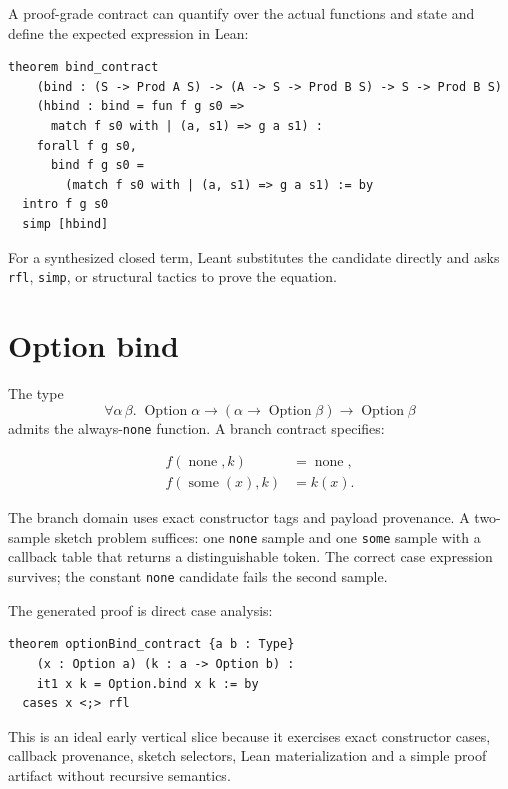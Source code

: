 \documentclass[11pt,oneside]{report}
\newcommand{\code}[1]{\texttt{#1}}
\begin{document}
A proof-grade contract can quantify over the actual functions and state and define the expected expression in Lean:

\begin{lstlisting}[language=LeanX,caption={Lean theorem shape for state bind.}]
theorem bind_contract
    (bind : (S -> Prod A S) -> (A -> S -> Prod B S) -> S -> Prod B S)
    (hbind : bind = fun f g s0 =>
      match f s0 with | (a, s1) => g a s1) :
    forall f g s0,
      bind f g s0 =
        (match f s0 with | (a, s1) => g a s1) := by
  intro f g s0
  simp [hbind]
\end{lstlisting}

For a synthesized closed term, Leant substitutes the candidate directly and asks \code{rfl}, \code{simp}, or structural tactics to prove the equation.

\section{Option bind}
\label{sec:example-option}

The type
\[
\forall \alpha\,\beta.\;\operatorname{Option}\alpha\to
(\alpha\to\operatorname{Option}\beta)\to\operatorname{Option}\beta
\]
admits the always-\code{none} function. A branch contract specifies:

\begin{align*}
 f(\operatorname{none},k) &= \operatorname{none},\\
 f(\operatorname{some}(x),k) &= k(x).
\end{align*}

The branch domain uses exact constructor tags and payload provenance. A two-sample sketch problem suffices: one \code{none} sample and one \code{some} sample with a callback table that returns a distinguishable token. The correct case expression survives; the constant \code{none} candidate fails the second sample.

The generated proof is direct case analysis:

\begin{lstlisting}[language=LeanX]
theorem optionBind_contract {a b : Type}
    (x : Option a) (k : a -> Option b) :
    it1 x k = Option.bind x k := by
  cases x <;> rfl
\end{lstlisting}

This is an ideal early vertical slice because it exercises exact constructor cases, callback provenance, sketch selectors, Lean materialization and a simple proof artifact without recursive semantics.
\end{document}
